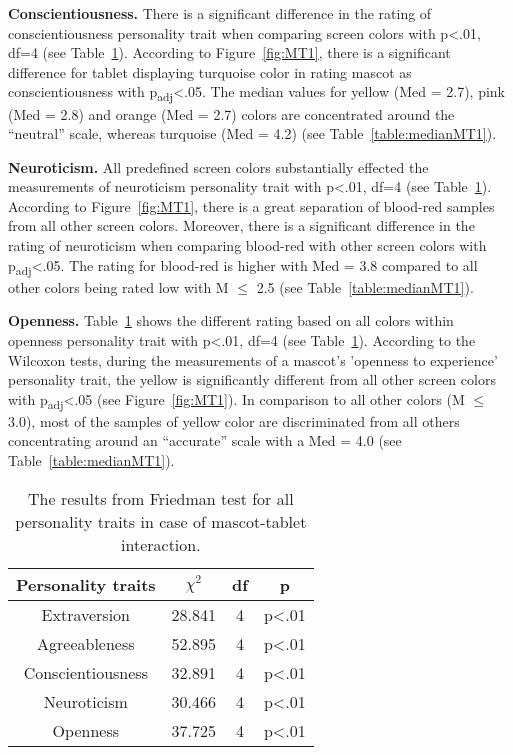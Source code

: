 \par\textbf{Conscientiousness.}
There is a significant difference in the rating of conscientiousness personality trait
when comparing screen colors with p<.01, df=4 (see Table~\ref{table:friedmanMT1}).
According to Figure~\ref{fig:MT1}, there is a significant difference for
tablet displaying turquoise color in rating mascot as conscientiousness with p\textsubscript{adj}<.05.
The median values for yellow (Med = 2.7), pink (Med = 2.8) and orange (Med = 2.7) colors are
concentrated around the “neutral” scale, whereas turquoise (Med = 4.2) (see Table~\ref{table:medianMT1}).

\par\textbf{Neuroticism.}
All predefined screen colors substantially effected the measurements of neuroticism personality
trait with p<.01, df=4 (see Table~\ref{table:friedmanMT1}).
According to Figure~\ref{fig:MT1}, there is a great separation of blood-red
samples from all other screen colors.
Moreover, there is a significant difference in the rating of neuroticism when comparing
blood-red with other screen colors with p\textsubscript{adj}<.05.
The rating for blood-red is higher with Med = 3.8 compared to all other colors
being rated low with M $\leq$ 2.5 (see Table~\ref{table:medianMT1}).

\par\textbf{Openness.}
Table~\ref{table:friedmanMT1} shows the different rating based on all colors within openness
personality trait with p<.01, df=4 (see Table~\ref{table:friedmanMT1}).
According to the Wilcoxon tests, during the measurements of a mascot's 'openness to experience'
personality trait, the yellow is significantly different from all other screen
colors with p\textsubscript{adj}<.05 (see Figure~\ref{fig:MT1}).
In comparison to all other colors (M $\leq$ 3.0), most of the samples of yellow color are discriminated
from all others concentrating around an “accurate” scale with a Med = 4.0 (see Table~\ref{table:medianMT1}).

\begin{table}[!htb]
    \renewcommand{\arraystretch}{1}
    \begin{center}
        \begin{tabular}{|c|c|c|c|}
            \hline
            \textbf{Personality traits} & \textbf{$\chi^2$} & \textbf{df} & \textbf{p} \\
            \hline
            Extraversion &28.841 &4 &p<.01 \\
            Agreeableness &52.895 &4 &p<.01 \\
            Conscientiousness &32.891 &4 &p<.01 \\
            Neuroticism &30.466 &4 &p<.01 \\
            Openness &37.725 &4 &p<.01 \\
            \hline
        \end{tabular}
        \caption{The results from Friedman test for all personality traits in case of mascot-tablet interaction.}
        \label{table:friedmanMT1}
    \end{center}
\end{table}

